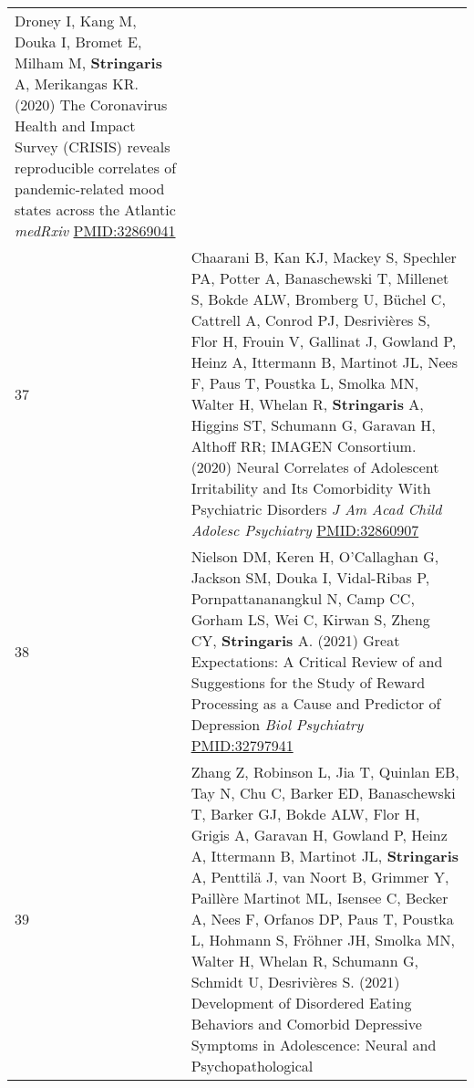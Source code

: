 \documentclass[
]{article}
\begin{document}
\begin{longtable}[]{@{}ll@{}}
\begin{minipage}[t]{0.94\columnwidth}
Droney I, Kang M, Douka I, Bromet E, Milham M, \textbf{Stringaris} A,
Merikangas KR. (2020) The Coronavirus Health and Impact Survey (CRISIS)
reveals reproducible correlates of pandemic-related mood states across
the Atlantic \emph{medRxiv} \url{PMID:32869041}\strut
\end{minipage}\tabularnewline
\begin{minipage}[t]{0.01\columnwidth}\raggedright
37\strut
\end{minipage} & \begin{minipage}[t]{0.94\columnwidth}\raggedright
Chaarani B, Kan KJ, Mackey S, Spechler PA, Potter A, Banaschewski T,
Millenet S, Bokde ALW, Bromberg U, Büchel C, Cattrell A, Conrod PJ,
Desrivières S, Flor H, Frouin V, Gallinat J, Gowland P, Heinz A,
Ittermann B, Martinot JL, Nees F, Paus T, Poustka L, Smolka MN, Walter
H, Whelan R, \textbf{Stringaris} A, Higgins ST, Schumann G, Garavan H,
Althoff RR; IMAGEN Consortium. (2020) Neural Correlates of Adolescent
Irritability and Its Comorbidity With Psychiatric Disorders \emph{J Am
Acad Child Adolesc Psychiatry} \url{PMID:32860907}\strut
\end{minipage}\tabularnewline
\begin{minipage}[t]{0.01\columnwidth}\raggedright
38\strut
\end{minipage} & \begin{minipage}[t]{0.94\columnwidth}\raggedright
Nielson DM, Keren H, O'Callaghan G, Jackson SM, Douka I, Vidal-Ribas P,
Pornpattananangkul N, Camp CC, Gorham LS, Wei C, Kirwan S, Zheng CY,
\textbf{Stringaris} A. (2021) Great Expectations: A Critical Review of
and Suggestions for the Study of Reward Processing as a Cause and
Predictor of Depression \emph{Biol Psychiatry} \url{PMID:32797941}\strut
\end{minipage}\tabularnewline
\begin{minipage}[t]{0.01\columnwidth}\raggedright
39\strut
\end{minipage} & \begin{minipage}[t]{0.94\columnwidth}\raggedright
Zhang Z, Robinson L, Jia T, Quinlan EB, Tay N, Chu C, Barker ED,
Banaschewski T, Barker GJ, Bokde ALW, Flor H, Grigis A, Garavan H,
Gowland P, Heinz A, Ittermann B, Martinot JL, \textbf{Stringaris} A,
Penttilä J, van Noort B, Grimmer Y, Paillère Martinot ML, Isensee C,
Becker A, Nees F, Orfanos DP, Paus T, Poustka L, Hohmann S, Fröhner JH,
Smolka MN, Walter H, Whelan R, Schumann G, Schmidt U, Desrivières S.
(2021) Development of Disordered Eating Behaviors and Comorbid
Depressive Symptoms in Adolescence: Neural and Psychopathological

\end{minipage}
\end{longtable}
\end{document}
